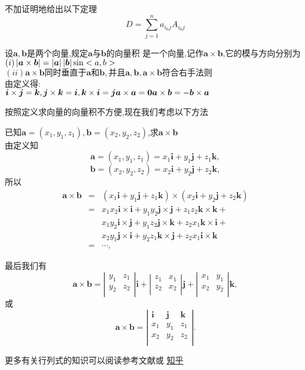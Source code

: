  不加证明地给出以下定理
$$
D=\sum_{j=1}^{n}a_{i_0j}A_{i_0j}
$$

 设$\bm{a},\bm{b}$是两个向量,规定$\bm{a}$与$\bm{b}$的向量积
是一个向量,记作$\bm{a}\times\bm{b}$,它的模与方向分别为\\
$(i) \left| {\bm{a}\times\bm{b}} \right|=\left| {\bm{a}} \right|\left| {\bm{b}} \right|\sin<a,b>$\\
$(ii)\bm{a}\times\bm{b}\textbf{同时垂直于}\bm{a}\textbf{和}\bm{b},\textbf{并且}\bm{a},\bm{b},\bm{a}\times\bm{b}\textbf{符合右手法则}$\\
由定义得:\\
$\bm{i}\times\bm{j}=\bm{k},\bm{j}\times\bm{k}=\bm{i},\bm{k}\times\bm{i}=\bm{j}\\ 
\bm{a}\times\bm{a}=\bm{0}\\
\bm{a}\times\bm{b}=-\bm{b}\times\bm{a}
$


按照定义求向量的向量积不方便,现在我们考虑以下方法

\prob 已知$\bm{a}=(x_1,y_1,z_1),\bm{b}=(x_2,y_2,z_2)$,求$\bm{a}\times\bm{b}$\\
\sol
由定义知
$$\bm{a}=(x_1,y_1,z_1)
=x_1\bm{i}+y_1\bm{j}+z_1\bm{k},$$
$$\bm{b}=(x_2,y_2,z_2)=
x_2\bm{i}+y_2\bm{j}+z_2\bm{k},
$$
所以 
\begin{eqnarray}
  \bm{a}\times\bm{b}
  &=&(x_1\bm{i}+y_1\bm{j}+z_1\bm{k})\times(x_2\bm{i}+y_2\bm{j}+z_2\bm{k})\nonumber\\
  &=&x_1x_2\bm{i}\times\bm{i}+y_1y_2\bm{j}\times\bm{j}+z_1z_2\bm{k}\times\bm{k}+\nonumber\\
  &&x_1y_2\bm{i}\times\bm{j}+y_1z_2\bm{j}\times\bm{k}+z_2x_1\bm{k}\times\bm{i}+\nonumber\\
  &&x_2y_1\bm{j}\times\bm{i}+y_2z_1\bm{k}\times\bm{j}+z_2x_1\bm{i}\times\bm{k}\nonumber\\
  &=&\cdots\nonumber, 
\end{eqnarray}

最后我们有
$$
\bm{a}\times\bm{b}=
\left|
  \begin{array}{cc}
    y_1&z_1\\
    y_2&z_2\\
  \end{array}
\right|\bm{i}
+
\left|
  \begin{array}{cc}
    z_1&x_1\\
    z_2&x_2\\
  \end{array}
\right|\bm{j}
+
\left|
  \begin{array}{cc}
    x_1&y_1\\
    x_2&y_2\\
  \end{array}
\right|\bm{k},
$$
或
$$
\bm{a}\times\bm{b}=
\left|
  \begin{array}{ccc}
    \bm{i}&\bm{j}&\bm{k}\\
    x_1&y_1&z_1\\
    x_2&y_2&z_2\\
  \end{array}
\right|.
$$

更多有关行列式的知识可以阅读参考文献或
\href{https://www.zhihu.com/question/36966326}{知乎}